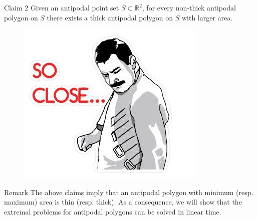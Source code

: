 \documentclass{beamer}
\newcommand{\R}{\mathbb{R}}
\begin{document}
\begin{frame}
\begin{alertblock}{Claim 2}
Given an antipodal point set $S \subset \R^2$, for every non-thick antipodal polygon
on $S$ there exists a thick antipodal polygon on $S$ with larger area.
\end{alertblock}\pause

\begin{figure}
\includegraphics[scale=0.6]{close}
\end{figure}
\end{frame}

\begin{frame}
\begin{block}{Remark}
The above claims imply that an antipodal polygon with minimum (resp. maximum)
area is thin (resp. thick). As a consequence, we will show that the extremal
problems for antipodal polygons can be solved in linear time.

\end{block}
\end{frame}
\end{document}
